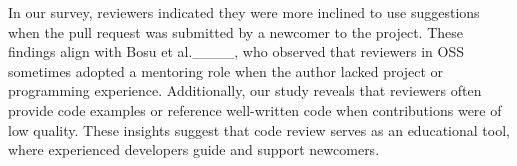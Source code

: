In our survey, reviewers indicated they were more inclined to use suggestions when the pull request was submitted by a newcomer to the project.
These findings align with Bosu et al.____, who observed that reviewers in OSS sometimes adopted a mentoring role when the author lacked project or programming experience. 
Additionally, our study reveals that reviewers often provide code examples or reference well-written code  when contributions were of low quality. 
These insights suggest that code review serves as an educational tool, where experienced developers guide and support newcomers.

